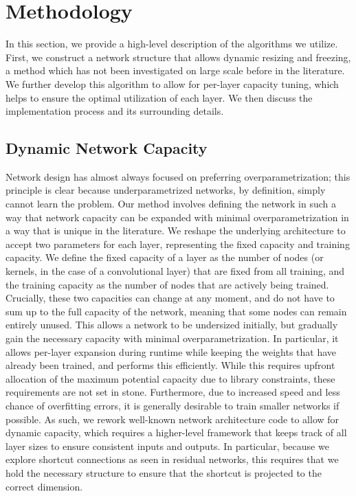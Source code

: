 \chapter{Methodology}
In this section, we provide a high-level description of the algorithms we utilize.
First, we construct a network structure that allows dynamic resizing and freezing, a method which has not been investigated on large scale before in the literature.
We further develop this algorithm to allow for per-layer capacity tuning, which helps to ensure the optimal utilization of each layer.
We then discuss the implementation process and its surrounding details.

\section{Dynamic Network Capacity}
Network design has almost always focused on preferring overparametrization; this principle is clear because underparametrized networks, by definition, simply cannot learn the problem.
Our method involves defining the network in such a way that network capacity can be expanded with minimal overparametrization in a way that is unique in the literature.
We reshape the underlying architecture to accept two parameters for each layer, representing the fixed capacity and training capacity.
We define the fixed capacity of a layer as the number of nodes (or kernels, in the case of a convolutional layer) that are fixed from all training, and the training capacity as the number of nodes that are actively being trained.
Crucially, these two capacities can change at any moment, and do not have to sum up to the full capacity of the network, meaning that some nodes can remain entirely unused.
This allows a network to be undersized initially, but gradually gain the necessary capacity with minimal overparametrization.
In particular, it allows per-layer expansion during runtime while keeping the weights that have already been trained, and performs this efficiently.
While this requires upfront allocation of the maximum potential capacity due to library constraints, these requirements are not set in stone.
Furthermore, due to increased speed and less chance of overfitting errors, it is generally desirable to train smaller networks if possible.
As such, we rework well-known network architecture code to allow for dynamic capacity, which requires a higher-level framework that keeps track of all layer sizes to ensure consistent inputs and outputs.
In particular, because we explore shortcut connections as seen in residual networks, this requires that we hold the necessary structure to ensure that the shortcut is projected to the correct dimension.

